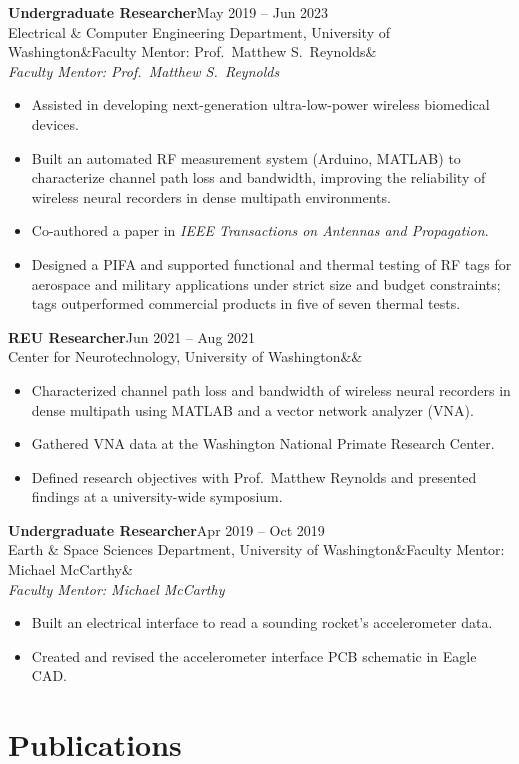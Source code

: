 \documentclass[11pt,letterpaper]{article}
\newcommand{\cventry}[4]{%
  \textbf{#1}\hfill #2\\
  #3\ifx&#4&\else\\ \textit{#4}\fi\par\vspace{2pt}}
\begin{document}
\cventry{Undergraduate Researcher}{May 2019 -- Jun 2023}
        {Electrical \& Computer Engineering Department, University of Washington}
        {Faculty Mentor: Prof.\ Matthew S.\ Reynolds}
\begin{itemize}
  \item Assisted in developing next-generation ultra-low-power wireless biomedical devices.
  \item Built an automated RF measurement system (Arduino, MATLAB) to characterize channel path loss and bandwidth, improving the reliability of wireless neural recorders in dense multipath environments.
  \item Co-authored a paper in \textit{IEEE Transactions on Antennas and Propagation}.
  \item Designed a PIFA and supported functional and thermal testing of RF tags for aerospace and military applications under strict size and budget constraints; tags outperformed commercial products in five of seven thermal tests.
\end{itemize}

\cventry{REU Researcher}{Jun 2021 -- Aug 2021}
        {Center for Neurotechnology, University of Washington}{}
\begin{itemize}
  \item Characterized channel path loss and bandwidth of wireless neural recorders in dense multipath using MATLAB and a vector network analyzer (VNA).
  \item Gathered VNA data at the Washington National Primate Research Center.
  \item Defined research objectives with Prof.\ Matthew Reynolds and presented findings at a university-wide symposium.
\end{itemize}

\cventry{Undergraduate Researcher}{Apr 2019 -- Oct 2019}
        {Earth \& Space Sciences Department, University of Washington}
        {Faculty Mentor: Michael McCarthy}
\begin{itemize}
  \item Built an electrical interface to read a sounding rocket's accelerometer data.
  \item Created and revised the accelerometer interface PCB schematic in Eagle CAD.
\end{itemize}

\section{Publications}
\end{document}
